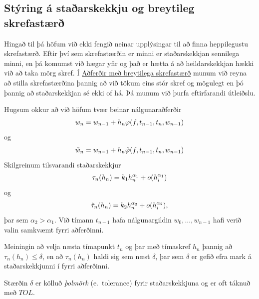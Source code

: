 \documentclass[letterpaper,10pt,icelandic]{sphinxmanual}
\begin{document}
\subsection{Stýring á staðarskekkju og breytileg skrefastærð}
\label{kafli06:styring-a-staarskekkju-og-breytileg-skrefastaer}
Hingað til þá höfum við ekki fengið neinar upplýsingar til að finna heppilegustu skrefastærð.
Eftir því sem skrefastærðin er minni er staðarskekkjan sennilega minni, en þá komumst við
hægar yfir og það er hætta á að heildarskekkjan hækki við að taka mörg skref.
Í {\hyperref[kafli06:aferir-me-breytilega-skrefastaer]{Aðferðir með breytilega skrefastærð}} munum við reyna að stilla
skrefastærðina þannig að við tökum eins stór skref og mögulegt en þó
þannig að staðarskekkjan sé ekki of há.
Þá munum við þurfa eftirfarandi útleiðslu.

Hugsum okkur að við höfum tvær beinar nálgunaraðferðir
\begin{gather}
\begin{split}w_{n} = w_{n-1} + h_n\varphi(f,t_{n-1},t_n,w_{n-1})\end{split}\notag
\end{gather}
og
\begin{gather}
\begin{split}\tilde w_{n} = w_{n-1} + h_n\tilde\varphi(f,t_{n-1},t_n,w_{n-1})\end{split}\notag
\end{gather}
Skilgreinum tilsvarandi staðarskekkjur
\begin{gather}
\begin{split}\tau_n(h_n) = k_1h_n^{\alpha_1} + o(h_i^{\alpha_1})\end{split}\notag
\end{gather}
og
\begin{gather}
\begin{split}\tilde\tau_n(h_n) = k_2h_n^{\alpha_2} + o(h_i^{\alpha_2}),\end{split}\notag
\end{gather}
þar sem \(\alpha_2>\alpha_1\). Við tímann \(t_{n-1}\) hafa
nálgunargildin \(w_0,\ldots,w_{n-1}\) hafi verið valin samkvæmt
fyrri aðferðinni.

Meiningin að velja næsta tímapunkt \(t_n\) og þar með tímaskref
\(h_n\) þannig að \(\tau_n(h_n)\leq \delta\), en að
\(\tau_n(h_n)\) haldi sig sem næst \(\delta\), þar sem
\(\delta\) er gefið efra mark á staðarskekkjunni í fyrri
aðferðinni.

Stærðin \(\delta\) er kölluð \emph{þolmörk} (e. tolerance) fyrir
staðarskekkjuna og er oft táknuð með \(TOL\).
\end{document}
